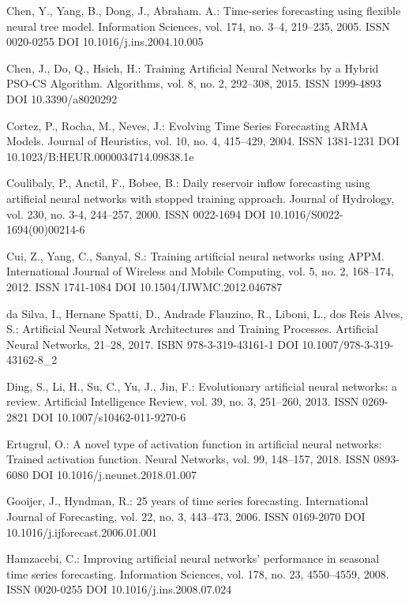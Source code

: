 \begin{thebibliography}{99.}
 Chen, Y., Yang, B., Dong, J., Abraham. A.: Time-series forecasting using flexible neural tree model. Information Sciences, vol. 174, no. 3--4, 219--235, 2005. ISSN 0020-0255 DOI 10.1016/j.ins.2004.10.005

 Chen, J., Do, Q., Hsieh, H.: Training Artificial Neural Networks by a Hybrid PSO-CS Algorithm. Algorithms, vol. 8, no. 2, 292--308, 2015. ISSN 1999-4893 DOI 10.3390/a8020292

 Cortez, P., Rocha, M., Neves, J.: Evolving Time Series Forecasting ARMA Models. Journal of Heuristics, vol. 10, no. 4, 415--429, 2004. ISSN 1381-1231 DOI 10.1023/B:HEUR.0000034714.09838.1e

 Coulibaly, P., Anctil, F., Bobee, B.: Daily reservoir inflow forecasting using artificial neural networks with stopped training approach. Journal of Hydrology, vol. 230, no. 3-4, 244--257, 2000. ISSN 0022-1694 DOI 10.1016/S0022-1694(00)00214-6

 Cui, Z., Yang, C., Sanyal, S.: Training artificial neural networks using APPM. International Journal of Wireless and Mobile Computing, vol. 5, no. 2, 168--174, 2012. ISSN 1741-1084 DOI 10.1504/IJWMC.2012.046787

 da Silva, I., Hernane Spatti, D., Andrade Flauzino, R., Liboni, L., dos Reis Alves, S.: Artificial Neural Network Architectures and Training Processes. Artificial Neural Networks, 21--28, 2017. ISBN 978-3-319-43161-1 DOI 10.1007/978-3-319-43162-8\_2

 Ding, S., Li, H., Su, C., Yu, J., Jin, F.: Evolutionary artificial neural networks: a review. Artificial Intelligence Review, vol. 39, no. 3, 251--260, 2013. ISSN 0269-2821 DOI 10.1007/s10462-011-9270-6

 Ertugrul, O.: A novel type of activation function in artificial neural networks: Trained activation function. Neural Networks, vol. 99, 148--157, 2018. ISSN 0893-6080 DOI 10.1016/j.neunet.2018.01.007

 Gooijer, J., Hyndman, R.: 25 years of time series forecasting. International Journal of Forecasting, vol. 22, no. 3, 443--473, 2006. ISSN 0169-2070 DOI 10.1016/j.ijforecast.2006.01.001

 Hamzacebi, C.: Improving artificial neural networks’ performance in seasonal time series forecasting. Information Sciences, vol. 178, no. 23, 4550--4559, 2008. ISSN 0020-0255 DOI 10.1016/j.ins.2008.07.024


\end{thebibliography}
